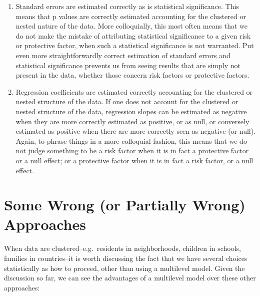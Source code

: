 \documentclass[
  letterpaper,
  DIV=11,
  numbers=noendperiod]{scrreprt}
\providecommand{\tightlist}{%
  \setlength{\itemsep}{0pt}\setlength{\parskip}{0pt}}\usepackage{longtable,booktabs,array}
\begin{document}
\begin{enumerate}
\def\labelenumi{\arabic{enumi}.}
\tightlist
\item
  Standard errors are estimated correctly as is statistical
  significance. This means that p values are correctly estimated
  accounting for the clustered or nested nature of the data. More
  colloquially, this most often means that we do not make the mistake of
  attributing statistical significance to a given risk or protective
  factor, when such a statistical significance is not warranted. Put
  even more straightforwardly correct estimation of standard errors and
  statistical significance prevents us from seeing results that are
  simply not present in the data, whether those concern risk factors or
  protective factors.
\item
  Regression coefficients are estimated correctly accounting for the
  clustered or nested structure of the data. If one does not account for
  the clustered or nested structure of the data, regression slopes can
  be estimated as negative when they are more correctly estimated as
  positive, or as null, or conversely estimated as positive when there
  are more correctly seen as negative (or null). Again, to phrase things
  in a more colloquial fashion, this means that we do not judge
  something to be a risk factor when it is in fact a protective factor
  or a null effect; or a protective factor when it is in fact a risk
  factor, or a null effect.
\end{enumerate}

\hypertarget{sec-wrongapproaches}{%
\section{Some Wrong (or Partially Wrong)
Approaches}\label{sec-wrongapproaches}}

When data are clustered--e.g.~residents in neighborhoods, children in
schools, families in countries--it is worth discussing the fact that we
have several choices statistically as how to proceed, other than using a
multilevel model. Given the discussion so far, we can see the advantages
of a multilevel model over these other approaches:
\end{document}
